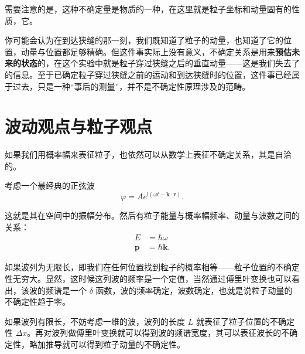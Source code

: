 \documentclass[12pt,a4paper,oneside]{book}
\begin{document}
需要注意的是，这种不确定量是物质的一种，在这里就是粒子坐标和动量固有的性质，它。

\begin{tcolorbox}[before upper={\parindent20pt},title=\textit{一些谬误思想},breakable,fontupper=\footnotesize,colframe=blue!40!white,colback=blue!5!white]
    你可能会认为在到达狭缝的那一刻，我们既知道了粒子的动量，也知道了它的位置，动量与位置都足够精确。但这件事实际上没有意义，不确定关系是用来\textbf{预估未来的状态}的，在这个实验中就是粒子穿过狭缝之后的垂直动量——这是我们失去了的信息。至于已确定粒子穿过狭缝之前的运动和到达狭缝时的位置，这件事已经属于过去，只是一种“事后的测量”，并不是不确定性原理涉及的范畴。
\end{tcolorbox}

\section{波动观点与粒子观点}

如果我们用概率幅来表征粒子，也依然可以从数学上表征不确定关系，其是自洽的。

考虑一个最经典的正弦波
\begin{equation}
    \varphi=Ae^{\textrm{i}(\omega t-\boldsymbol{k \cdot r})}.
\end{equation}

这就是其在空间中的振幅分布。然后有粒子能量与概率幅频率、动量与波数之间的关系：
\begin{equation}
    \begin{aligned}
        E&=\hbar\omega\\
        \boldsymbol{p}&=\hbar\boldsymbol{k}.
      \end{aligned}
\end{equation}

如果波列为无限长，即我们在任何位置找到粒子的概率相等——粒子位置的不确定性无穷大。显然，这时候这列波的频率是一个定值，当然通过傅里叶变换也可以看出，该波的频谱是一个 $\delta$ 函数，波的频率确定，波数确定，也就是说粒子动量的不确定性趋于零。

如果波列有限长，不妨考虑一维的波，波列的长度 $L$ 就表征了粒子位置的不确定性 $\Delta x$。再对波列做傅里叶变换就可以得到波的频谱宽度，其可以表征波长的不确定性，略加推导就可以得到粒子动量的不确定性。
\end{document}
